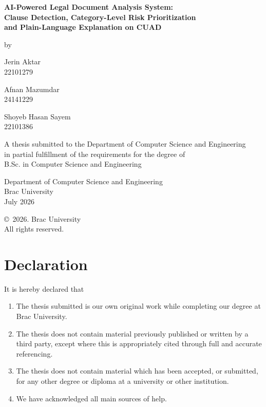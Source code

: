 \documentclass[12pt, a4paper, oneside]{report}
\newcommand{\frontchapter}[1]{%
  \chapter*{#1}\addcontentsline{toc}{chapter}{#1}}
\begin{document}
\begin{titlepage}
\centering
{\Large\bfseries AI-Powered Legal Document Analysis System:\\
Clause Detection, Category-Level Risk Prioritization\\ and Plain-Language Explanation on CUAD\par}
\vspace{1.6cm}
{\normalsize by\par}
\vspace{0.6cm}
{\large Jerin Aktar\\ \normalsize 22101279\par}\vspace{0.35cm}
{\large Afnan Mazumdar\\ \normalsize 24141229\par}\vspace{0.35cm}
{\large Shoyeb Hasan Sayem\\ \normalsize 22101386\par}
\vspace{1.4cm}
{\normalsize A thesis submitted to the Department of Computer Science and Engineering\\
in partial fulfillment of the requirements for the degree of\\
B.Sc. in Computer Science and Engineering\par}
\vspace{1.4cm}
{\normalsize Department of Computer Science and Engineering\\
Brac University\\
July 2026\par}
\vfill
{\small \copyright~2026. Brac University\\ All rights reserved.\par}
\end{titlepage}

\setcounter{page}{2}

\frontchapter{Declaration}
It is hereby declared that
{\singlespacing
\begin{enumerate}[itemsep=3pt, topsep=6pt]
  \item The thesis submitted is our own original work while completing our degree at Brac University.
  \item The thesis does not contain material previously published or written by a third party, except where this is appropriately cited through full and accurate referencing.
  \item The thesis does not contain material which has been accepted, or submitted, for any other degree or diploma at a university or other institution.
  \item We have acknowledged all main sources of help.
\end{enumerate}
}
\vspace{0.7cm}
\end{document}
